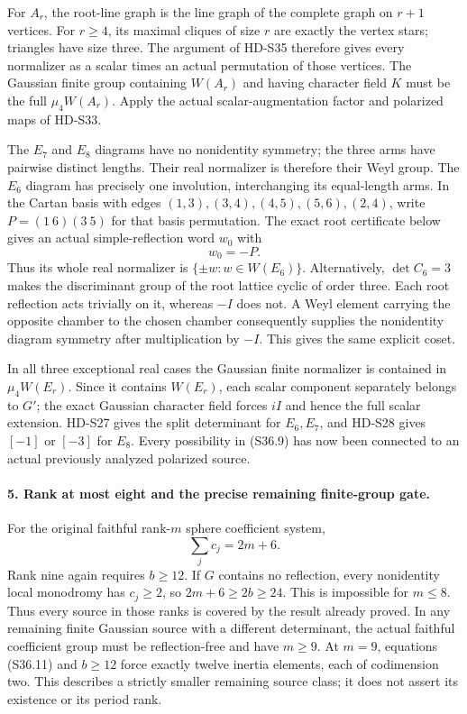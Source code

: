 For \(A_r\), the root-line graph is the line graph of the complete
graph on \(r+1\) vertices. For \(r\ge4\), its maximal cliques
of size \(r\) are exactly the vertex stars; triangles have size
three. The argument of HD-S35 therefore gives every normalizer
as a scalar times an actual permutation of those vertices. The
Gaussian finite group containing \(W(A_r)\) and having character
field \(K\) must be the full \(\mu_4W(A_r)\). Apply the actual
scalar-augmentation factor and polarized maps of HD-S33.

The \(E_7\) and \(E_8\) diagrams have no nonidentity symmetry;
the three arms have pairwise distinct lengths. Their real normalizer
is therefore their Weyl group. The \(E_6\) diagram has precisely
one involution, interchanging its equal-length arms. In the Cartan
basis with edges
\((1,3),(3,4),(4,5),(5,6),(2,4)\), write
\(P=(1\ 6)(3\ 5)\) for that basis permutation. The exact root
certificate below gives an actual simple-reflection word \(w_0\)
with
\[
                            w_0=-P.                          \tag{S36.10}
\]
Thus its whole real normalizer is \(\{\pm w:w\in W(E_6)\}\).
Alternatively, \(\det C_6=3\) makes the discriminant group of
the root lattice cyclic of order three. Each root reflection acts
trivially on it, whereas \(-I\) does not. A Weyl element carrying
the opposite chamber to the chosen chamber consequently supplies
the nonidentity diagram symmetry after multiplication by \(-I\).
This gives the same explicit coset.

In all three exceptional real cases the Gaussian finite normalizer
is contained in \(\mu_4 W(E_r)\). Since it contains \(W(E_r)\),
each scalar component separately belongs to \(G'\); the exact
Gaussian character field forces \(iI\) and hence the full scalar
extension. HD-S27 gives the split determinant for \(E_6,E_7\),
and HD-S28 gives \([-1]\) or \([-3]\) for \(E_8\).
Every possibility in (S36.9) has now been connected to an actual
previously analyzed polarized source.

\paragraph{5. Rank at most eight and the precise remaining finite-group gate.}
For the original faithful rank-\(m\) sphere coefficient system,
\[
                       \sum_jc_j=2m+6.                       \tag{S36.11}
\]
Rank nine again requires \(b\ge12\). If \(G\) contains no
reflection, every nonidentity local monodromy has \(c_j\ge2\),
so \(2m+6\ge2b\ge24\). This is impossible for \(m\le8\).
Thus every source in those ranks is covered by the result already
proved. In any remaining finite Gaussian source with a different
determinant, the actual faithful coefficient group must be
reflection-free and have \(m\ge9\). At \(m=9\), equations
(S36.11) and \(b\ge12\) force exactly twelve inertia elements,
each of codimension two. This describes a strictly smaller remaining
source class; it does not assert its existence or its period rank.

